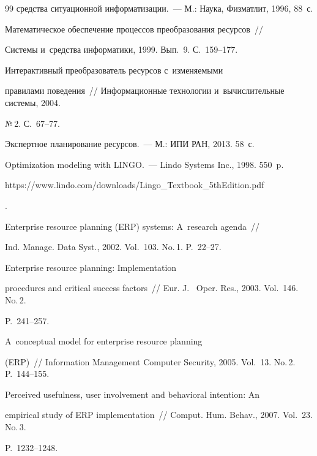{{\begin{thebibliography}{99}
средства ситуационной информатизации.~--- М.: Наука, Физматлит, 1996, 88~с.




 Математическое обеспечение процессов преобразования ресурсов~/\!\!/ 


Сис\-те\-мы и~средства информатики, 1999. Вып.~9. С.~159--177.




 Интерактивный преобразователь ресурсов с~изменяемыми 


правилами поведения~/\!\!/ Информационные технологии и~вы\-чис\-ли\-тель\-ные сис\-те\-мы, 2004. 


№\,2. С.~67--77.




 Экспертное планирование ресурсов.~--- М.: ИПИ РАН, 2013. 58~с.







 Optimization modeling with LINGO.~--- Lindo Systems Inc., 1998. 550~p. {\sf 


https://www.lindo.com/downloads/Lingo\_Textbook\_5thEdition.pdf}.




 Enterprise resource planning (ERP) systems: A~research agenda~/\!\!/ 


Ind. Manage.  Data Syst., 2002. Vol.~103. No.\,1. P.~22--27. 




 Enterprise resource planning: Implementation 


procedures and critical success factors~/\!\!/ Eur. J.~ Oper. Res., 2003. Vol.~146. No.\,2. 


P.~241--257.




 A~conceptual model for enterprise resource planning 


(ERP)~/\!\!/ Information Management Computer Security, 2005. Vol.~13. No.\,2. P.~144--155. 




 Perceived usefulness, user involvement and behavioral intention: An 


empirical study of ERP implementation~/\!\!/ Comput. Hum. Behav., 2007. Vol.~23. No.\,3. 


P.~1232--1248. 





 \end{thebibliography}


} }











